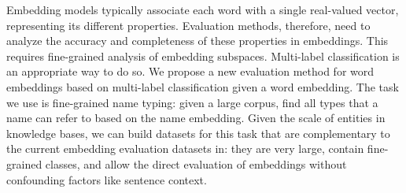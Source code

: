 Embedding models typically associate each word with a single real-valued vector, representing its different properties. Evaluation methods, therefore, need to analyze the accuracy and completeness of these properties in embeddings. This requires fine-grained analysis of embedding subspaces. Multi-label classification is an appropriate way to do so. We propose a new evaluation method for word embeddings based on multi-label classification given a word embedding. The task we use is fine-grained name typing: given a large corpus, find all types that a name can refer to based on the name embedding. Given the scale of entities in knowledge bases, we can build datasets for this task that are complementary to the current embedding evaluation datasets in: they are very large, contain fine-grained classes, and allow the direct evaluation of embeddings without confounding factors like sentence context.
